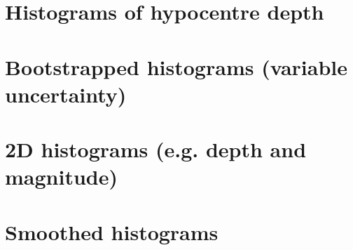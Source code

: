 \section{Histograms of hypocentre depth}

\section{Bootstrapped histograms (variable uncertainty)}

\section{2D histograms (e.g. depth and magnitude)}

\section{Smoothed histograms}